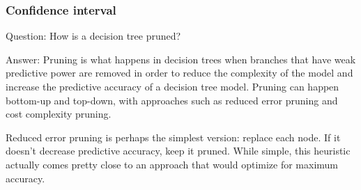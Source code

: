 \documentclass[11pt]{beamer}
\begin{document}
\begin{frame}
\frametitle{Confidence interval}
\begin{block}{Question:}
	How is a decision tree pruned?
\end{block}
\begin{block}{Answer:}
	Pruning is what happens in decision trees when branches that have weak predictive power are removed in order to reduce the complexity of the model and increase the predictive accuracy of a decision tree model. Pruning can happen bottom-up and top-down, with approaches such as reduced error pruning and cost complexity pruning.
	
	Reduced error pruning is perhaps the simplest version: replace each node. If it doesn’t decrease predictive accuracy, keep it pruned. While simple, this heuristic actually comes pretty close to an approach that would optimize for maximum accuracy.
\end{block}
\end{frame}
\end{document}
